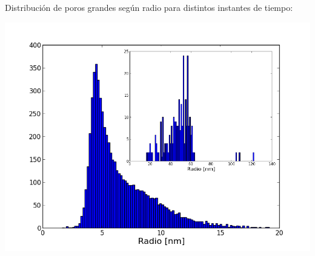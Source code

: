 \documentclass[a0,portrait]{a0poster}
\begin{document}
\begin{multicols}{2}



\begin{multicols}{2}

Distribución de poros grandes según radio para distintos instantes de tiempo:


	\begin{center}\vspace{1cm}
	\includegraphics[width=1\linewidth]{hist-pip}
	\end{center}\vspace{1cm}


\columnbreak
%
%


\end{multicols}
\end{multicols}
\end{document}
